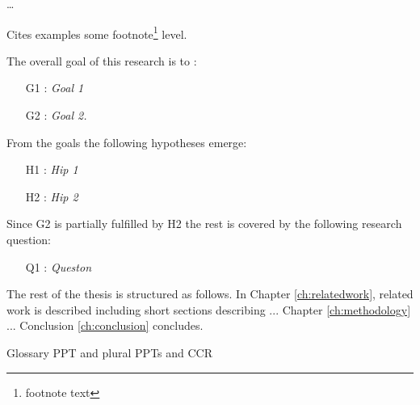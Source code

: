\lipsum[1-4]

\ldots

Cites examples \cite{ryan1991motivational, hebb1985social, Saxon2000} some footnote\footnote{footnote text} level.  

The overall goal of this research is to :
\begin{itemize}
  \item[G1]: \textit{Goal 1}
  \item[G2]: \textit{Goal 2.}
\end{itemize}
From the goals the following hypotheses emerge:
\begin{itemize}
  \item[H1]: \textit{Hip 1}
  \item[H2]: \textit{Hip 2}
\end{itemize}
Since G2 is partially fulfilled by H2 the rest is covered by the following research question:
\begin{itemize}
  \item[Q1]: \textit{Queston}
\end{itemize}

The rest of the thesis is structured as follows. In Chapter \ref{ch:relatedwork}, related work is described including short sections describing ... Chapter \ref{ch:methodology} ... Conclusion \ref{ch:conclusion} concludes. \cite{ottenstein1976, leach1995}
 
Glossary \gls{PPT} and plural \glspl{PPT} and \gls{CCR}
